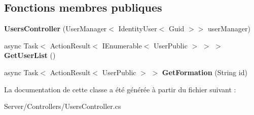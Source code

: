\subsection*{Fonctions membres publiques}
\begin{DoxyCompactItemize}
\item 
\mbox{\label{class_mediwatch_1_1_server_1_1_controllers_1_1_users_controller_aa150b9ceff5e45229a24c07a369bc84d}} 
{\bfseries Users\+Controller} (User\+Manager$<$ Identity\+User$<$ Guid $>$$>$ user\+Manager)
\item 
\mbox{\label{class_mediwatch_1_1_server_1_1_controllers_1_1_users_controller_a5b525adc63d36869bde5021b82480228}} 
async Task$<$ Action\+Result$<$ I\+Enumerable$<$ User\+Public $>$ $>$ $>$ {\bfseries Get\+User\+List} ()
\item 
\mbox{\label{class_mediwatch_1_1_server_1_1_controllers_1_1_users_controller_ad3132477ab092f3d33cd4b354a435a9a}} 
async Task$<$ Action\+Result$<$ User\+Public $>$ $>$ {\bfseries Get\+Formation} (String id)
\end{DoxyCompactItemize}


La documentation de cette classe a été générée à partir du fichier suivant \+:\begin{DoxyCompactItemize}
\item 
Server/\+Controllers/Users\+Controller.\+cs\end{DoxyCompactItemize}
